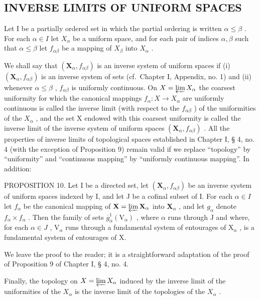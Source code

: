 \subsection{INVERSE LIMITS OF UNIFORM SPACES}

Let I be a partially ordered set in which the partial ordering is written \(\alpha \leqslant \beta\) . For each \(\alpha \in I\) let \(X_{\alpha}\) be a uniform space, and for each pair of indices \(\alpha, \beta\) such that \(\alpha \leqslant \beta\) let \(f_{\alpha \beta}\) be a mapping of \(X_{\beta}\) into \(X_{\alpha}\) .

We shall say that \((\mathbf{X}_{\alpha}, f_{\alpha\beta})\) is an inverse system of uniform spaces if (i) \((\mathbf{X}_{\alpha}, f_{\alpha\beta})\) is an inverse system of sets (cf.~Chapter I, Appendix, no. 1) and (ii) whenever \(\alpha \leqslant \beta\) , \(f_{\alpha\beta}\) is uniformly continuous. On \(X = \varprojlim X_{\alpha}\) the coarsest uniformity for which the canonical mappings \(f_{\alpha}: X \to X_{\alpha}\) are uniformly continuous is called the inverse limit (with respect to the \(f_{\alpha\beta}\) ) of the uniformities of the \(X_{\alpha}\) , and the set X endowed with this coarsest uniformity is called the inverse limit of the inverse system of uniform spaces \((\mathbf{X}_{\alpha}, f_{\alpha\beta})\) . All the properties of inverse limits of topological spaces established in Chapter I, § 4, no. 4 (with the exception of Proposition 9) remain valid if we replace ``topology'' by ``uniformity'' and ``continuous mapping'' by ``uniformly continuous mapping''. In addition:

PROPOSITION 10. Let I be a directed set, let \((\mathbf{X}_{\alpha}, f_{\alpha \beta})\) be an inverse system of uniform spaces indexed by I, and let J be a cofinal subset of I. For each \(\alpha \in I\) let \(f_{\alpha}\) be the canonical mapping of \(\mathbf{X} = \varprojlim \mathbf{X}_{\alpha}\) into \(\mathbf{X}_{\alpha}\) , and let \(g_{\alpha}\) denote \(f_{\alpha} \times f_{\alpha}\) . Then the family of sets \(\overline{g}_{\alpha}^{1}(\mathrm{V}_{\alpha})\) , where \(\alpha\) runs through J and where, for each \(\alpha \in J\) , \(\mathrm{V}_{\alpha}\) runs through a fundamental system of entourages of \(\mathrm{X}_{\alpha}\) , is a fundamental system of entourages of X.

We leave the proof to the reader; it is a straightforward adaptation of the proof of Proposition 9 of Chapter I, § 4, no. 4.

Finally, the topology on \(X = \varprojlim X_{\alpha}\) induced by the inverse limit of the uniformities of the \(X_{\alpha}\) is the inverse limit of the topologies of the \(X_{\alpha}\) .

